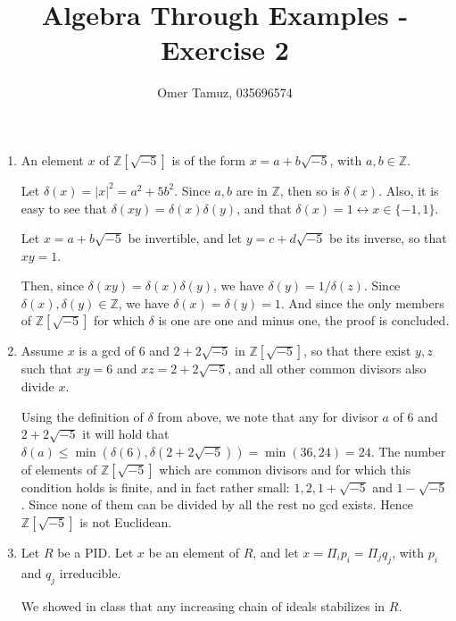 \documentclass[11pt]{article} \usepackage{amssymb}
\newcommand{\Z}{\mathbb Z} \newcommand{\CalE}{{\mathcal{E}}}
\begin{document}
\title{Algebra Through Examples - Exercise 2}

 \author{Omer Tamuz, 035696574}
\maketitle


\begin{enumerate}
  \item An element $x$ of $\Z[\sqrt{-5}]$ is of the form $x=a+b\sqrt{-5}$, with $a,b\in\Z$. 

    Let $\delta(x)=|x|^2=a^2+5b^2$. Since $a,b$ are in $\Z$, then so is $\delta(x)$. Also,
    it is easy to see that $\delta(xy)=\delta(x)\delta(y)$, and that 
    $\delta(x)=1\leftrightarrow x\in\{-1,1\}$.

    Let
    $x=a+b\sqrt{-5}$ be invertible, and let $y=c+d\sqrt{-5}$ be its inverse, 
    so that $xy=1$. 
    

    Then, since $\delta(xy)=\delta(x)\delta(y)$,
    we have $\delta(y)=1/\delta(z)$. Since $\delta(x),\delta(y)\in\Z$, we have 
    $\delta(x)=\delta(y)=1$. And since the only members of $\Z[\sqrt{-5}]$
    for which $\delta$ is one are one and minus one, the proof is concluded.
    
  \item Assume $x$ is a gcd of $6$ and $2+2\sqrt{-5}$ in $\Z[\sqrt{-5}]$, so that there exist
    $y,z$ such that $xy=6$
    and $xz=2+2\sqrt{-5}$, and all other common divisors also divide $x$.


    Using the definition of $\delta$ from above, we note that any for divisor $a$
    of $6$ and $2+2\sqrt{-5}$ it will hold that 
    $\delta(a)\leq \min(\delta(6),\delta(2+2\sqrt{-5}))=\min(36,24)=24$. The number of elements of 
    $\Z[\sqrt{-5}]$ which are common divisors and for which this condition holds is 
    finite, and in fact
    rather small: $1,2,1+\sqrt{-5}$ and $1-\sqrt{-5}$. Since none of them can be divided
    by all the rest no gcd exists. Hence $\Z[\sqrt{-5}]$ is not Euclidean.

  \item Let $R$ be a PID.  Let $x$ be an element of $R$, and let
    $x=\Pi_ip_i=\Pi_jq_j$, with $p_i$ and $q_j$ irreducible.

    We showed in class that any increasing chain
    of ideals stabilizes in $R$.


\end{enumerate}
\end{document}
